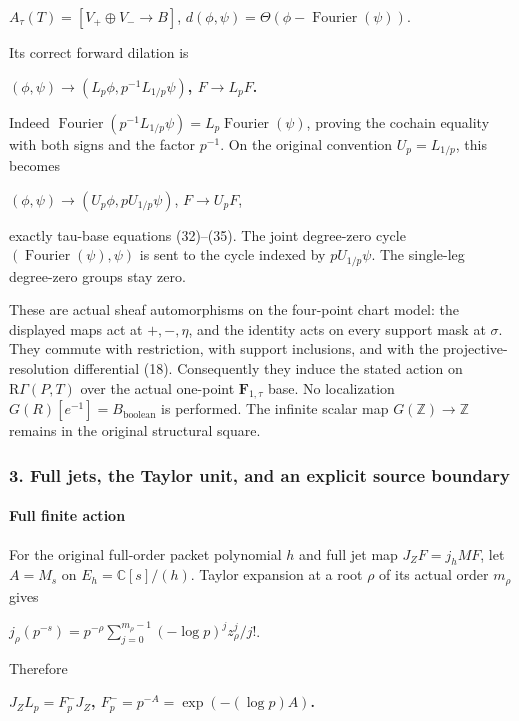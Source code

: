 \(A_\tau(T)=[V_{+}\oplus V_{-}\to B]\), \(d(\phi,\psi)=\Theta(\phi-\operatorname{Fourier}(\psi))\).

Its correct forward dilation is

\textbf{\((\phi,\psi) \to  (L_p \phi,p^{-1}L_{1/p}\psi)\), \(F \to  L_pF\).}

Indeed \(\operatorname{Fourier}(p^{-1}L_{1/p}\psi)=L_p \operatorname{Fourier}(\psi)\), proving the cochain equality with both signs and the factor \(p^{-1}\). On the original convention \(U_p=L_{1/p}\), this becomes

\((\phi,\psi)\to (U_p \phi,p U_{1/p}\psi)\), \(F\to U_pF\),

exactly tau-base equations (32)--(35). The joint degree-zero cycle \((\operatorname{Fourier}(\psi),\psi)\) is sent to the cycle indexed by \(p U_{1/p}\psi\). The single-leg degree-zero groups stay zero.

These are actual sheaf automorphisms on the four-point chart model: the displayed maps act at \(+,-,\eta\), and the identity acts on every support mask at \(\sigma\). They commute with restriction, with support inclusions, and with the projective-resolution differential (18). Consequently they induce the stated action on \(\mathrm R\Gamma(P,T)\) over the actual one-point \(\mathbf F_{1,\tau}\) base. No localization \(G(R)[e^{-1}]=B_{\mathrm{boolean}}\) is performed. The infinite scalar map \(G(\mathbb Z)\to\mathbb Z\) remains in the original structural square.

\subsubsection{3. Full jets, the Taylor unit, and an explicit source boundary}\label{endpoint-f1_scaling--full-jets-the-taylor-unit-and-an-explicit-source-boundary}

\paragraph{Full finite action}\label{endpoint-f1_scaling--full-finite-action}

For the original full-order packet polynomial \(h\) and full jet map \(J_ZF=j_h MF\), let \(A=M_s\) on \(E_h=\mathbb C[s]/(h)\). Taylor expansion at a root \(\rho\) of its actual order \(m_\rho\) gives

\(j_\rho(p^{-s})=p^{-\rho} \sum_{j=0}^{m_\rho-1}(-\log p)^j z_\rho^j/j!\).

Therefore

\textbf{\(J_Z L_p=F_p^- J_Z\), \(F_p^-=p^{-A}=\exp(-(\log p)A)\).}

